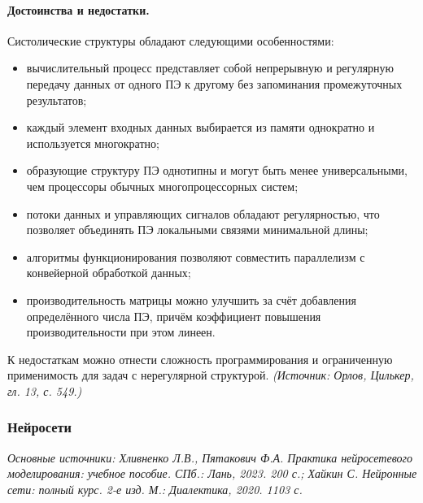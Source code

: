 \documentclass[a4paper,12pt]{article}
\begin{document}
\paragraph{Достоинства и недостатки.}
Систолические структуры обладают следующими особенностями:
\begin{itemize}
\item вычислительный процесс представляет собой непрерывную и регулярную передачу данных от одного ПЭ к другому без запоминания промежуточных результатов;
\item каждый элемент входных данных выбирается из памяти однократно и используется многократно;
\item образующие структуру ПЭ однотипны и могут быть менее универсальными, чем процессоры обычных многопроцессорных систем;
\item потоки данных и управляющих сигналов обладают регулярностью, что позволяет объединять ПЭ локальными связями минимальной длины;
\item алгоритмы функционирования позволяют совместить параллелизм с конвейерной обработкой данных;
\item производительность матрицы можно улучшить за счёт добавления определённого числа ПЭ, причём коэффициент повышения производительности при этом линеен.
\end{itemize}
К недостаткам можно отнести сложность программирования и ограниченную применимость для задач с нерегулярной структурой.
\textit{(Источник: Орлов, Цилькер, гл. 13, с. 549.)}

\subsubsection{Нейросети}

\noindent\textit{Основные источники: Хливненко Л.В., Пятакович Ф.А. Практика нейросетевого моделирования: учебное пособие. СПб.: Лань, 2023. 200 с.; Хайкин С. Нейронные сети: полный курс. 2-е изд. М.: Диалектика, 2020. 1103 с.}
\end{document}
